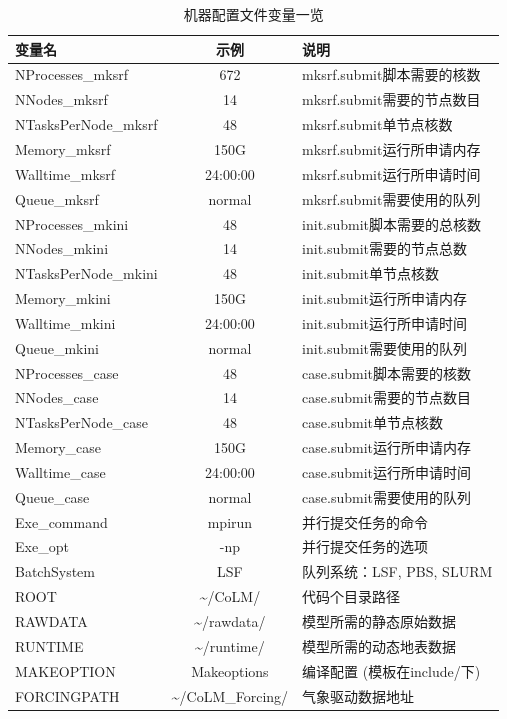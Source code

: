 \begin{table}[!htbp]
\caption{机器配置文件变量一览} \label{table_machineconfig}
\centering \renewcommand{\arraystretch}{1.2}
\begin{tabular}{lcp{}}
\toprule
\textbf{变量名} & \textbf{示例} & \textbf{说明} \\ \midrule
NProcesses\_mksrf & 672 & mksrf.submit脚本需要的核数 \\
NNodes\_mksrf & 14 & mksrf.submit需要的节点数目 \\
NTasksPerNode\_mksrf & 48 & mksrf.submit单节点核数 \\
Memory\_mksrf & 150G & mksrf.submit运行所申请内存 \\
Walltime\_mksrf & 24:00:00 & mksrf.submit运行所申请时间 \\
Queue\_mksrf & normal & mksrf.submit需要使用的队列 \\
NProcesses\_mkini & 48 &init.submit脚本需要的总核数 \\
NNodes\_mkini & 14 & init.submit需要的节点总数 \\
NTasksPerNode\_mkini & 48 & init.submit单节点核数 \\
Memory\_mkini & 150G & init.submit运行所申请内存 \\
Walltime\_mkini & 24:00:00 & init.submit运行所申请时间 \\
Queue\_mkini & normal & init.submit需要使用的队列 \\
NProcesses\_case & 48 & case.submit脚本需要的核数 \\
NNodes\_case & 14 & case.submit需要的节点数目 \\
NTasksPerNode\_case & 48 & case.submit单节点核数 \\
Memory\_case & 150G & case.submit运行所申请内存 \\
Walltime\_case & 24:00:00 & case.submit运行所申请时间 \\
Queue\_case & normal & case.submit需要使用的队列 \\
Exe\_command & mpirun & 并行提交任务的命令 \\
Exe\_opt & -np & 并行提交任务的选项 \\
BatchSystem & LSF & 队列系统：LSF, PBS, SLURM \\
ROOT & \textasciitilde/CoLM/ & 代码个目录路径 \\
RAWDATA & \textasciitilde/rawdata/ & 模型所需的静态原始数据 \\
RUNTIME & \textasciitilde/runtime/ & 模型所需的动态地表数据 \\
MAKEOPTION & Makeoptions & 编译配置 (模板在include/下) \\
FORCINGPATH & \textasciitilde/CoLM\_Forcing/ &气象驱动数据地址 \\
\bottomrule
\end{tabular}
\end{table}

